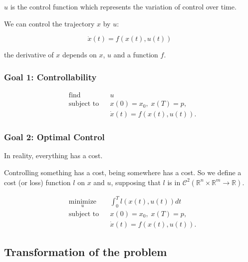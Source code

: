 \documentclass{report}
\begin{document}
$u$ is the control function which represents the variation of control over time.

We can control the trajectory $x$ by $u$: 

\begin{equation}
\dot{x} (t) = f(x(t), u(t))
\end{equation}

the derivative of $x$ depends on $x$, $u$ and a function $f$. 



\subsubsection{Goal 1: Controllability}

\begin{equation}
\begin{aligned}
& {\text{find}}
& & u \\
& \text{subject to}
& & x(0) = x_0, \; x(T) = p, \\
&&& \dot{x} (t) = f(x(t), u(t)).
\end{aligned}
\end{equation}

\subsubsection{Goal 2: Optimal Control}
In reality, everything has a cost.

Controlling something has a cost, being somewhere has a cost. So we define a cost (or loss) function $l$ on $x$ and $u$, supposing that $l$ is in $\mathscr{C}^2(\mathbb{R}^n \times \mathbb{R}^m \to \mathbb{R})$.
 

\begin{equation}
\begin{aligned}
& \underset{u}{\text{minimize}}
& & \int_0^T l(x(t),u(t)) dt \\
& \text{subject to}
& & x(0) = x_0, \; x(T) = p, \\
&&& \dot{x} (t) = f(x(t), u(t)).
\end{aligned}
\end{equation}

%

\subsection{Transformation of the problem}
\end{document}
